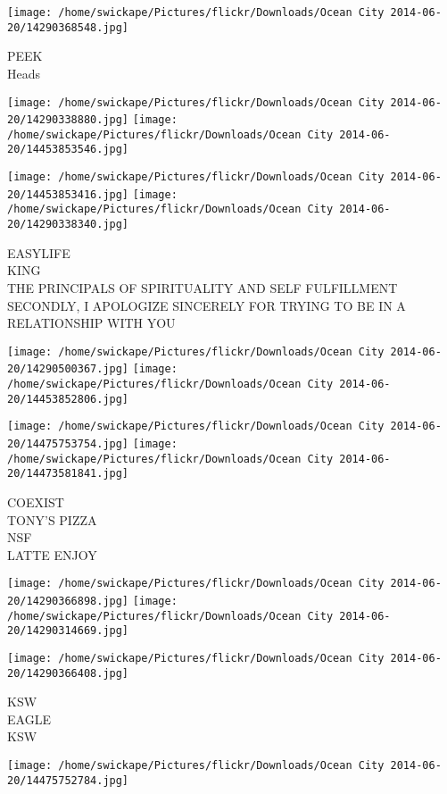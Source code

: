 \documentclass[10pt,letterpaper]{article}
\begin{document}
\vspace{0.25in}
\texttt{[image: /home/swickape/Pictures/flickr/Downloads/Ocean City 2014-06-20/14290368548.jpg]}

PEEK\\
Heads
\pagebreak

\texttt{[image: /home/swickape/Pictures/flickr/Downloads/Ocean City 2014-06-20/14290338880.jpg]}
\texttt{[image: /home/swickape/Pictures/flickr/Downloads/Ocean City 2014-06-20/14453853546.jpg]}

\texttt{[image: /home/swickape/Pictures/flickr/Downloads/Ocean City 2014-06-20/14453853416.jpg]}
\texttt{[image: /home/swickape/Pictures/flickr/Downloads/Ocean City 2014-06-20/14290338340.jpg]}

EASYLIFE\\
KING\\
THE PRINCIPALS OF SPIRITUALITY AND SELF FULFILLMENT\\
SECONDLY, I APOLOGIZE SINCERELY FOR TRYING TO BE IN A RELATIONSHIP WITH YOU
\pagebreak

\texttt{[image: /home/swickape/Pictures/flickr/Downloads/Ocean City 2014-06-20/14290500367.jpg]}
\texttt{[image: /home/swickape/Pictures/flickr/Downloads/Ocean City 2014-06-20/14453852806.jpg]}

\texttt{[image: /home/swickape/Pictures/flickr/Downloads/Ocean City 2014-06-20/14475753754.jpg]}
\texttt{[image: /home/swickape/Pictures/flickr/Downloads/Ocean City 2014-06-20/14473581841.jpg]}

COEXIST\\
TONY'S PIZZA\\
NSF\\
LATTE ENJOY
\pagebreak

\texttt{[image: /home/swickape/Pictures/flickr/Downloads/Ocean City 2014-06-20/14290366898.jpg]}
\texttt{[image: /home/swickape/Pictures/flickr/Downloads/Ocean City 2014-06-20/14290314669.jpg]}

\texttt{[image: /home/swickape/Pictures/flickr/Downloads/Ocean City 2014-06-20/14290366408.jpg]}

KSW\\
EAGLE\\
KSW
\pagebreak

\texttt{[image: /home/swickape/Pictures/flickr/Downloads/Ocean City 2014-06-20/14475752784.jpg]}
\end{document}
